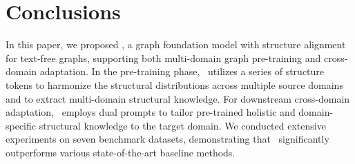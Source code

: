 \section{Conclusions}
In this paper, we proposed \model, a graph foundation model with structure alignment for text-free graphs, supporting both multi-domain graph pre-training and cross-domain adaptation. In the pre-training phase, \model\ utilizes a series of structure tokens to harmonize the structural distributions across multiple source domains and to extract multi-domain structural knowledge. For downstream cross-domain adaptation, \model\ employs dual prompts to tailor pre-trained holistic and domain-specific structural knowledge to the target domain. We conducted extensive experiments on seven benchmark datasets, demonstrating that \model\ significantly outperforms various state-of-the-art baseline methods.

